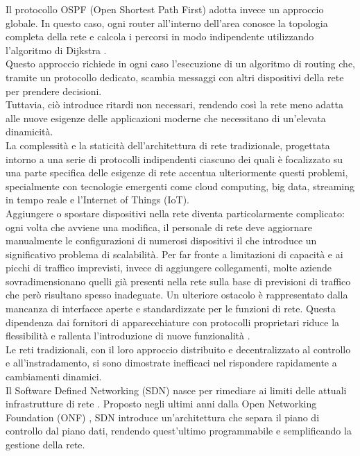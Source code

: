 Il protocollo OSPF (Open Shortest Path First) adotta invece un approccio globale.
In questo caso, ogni router all'interno dell'area conosce la topologia completa della rete e calcola i percorsi in modo indipendente utilizzando l'algoritmo di Dijkstra \cite{ospf}. 
\\Questo approccio richiede in ogni caso l'esecuzione di un algoritmo di routing che, tramite un protocollo dedicato, 
scambia messaggi con altri dispositivi della rete per prendere decisioni.
\\Tuttavia, ciò introduce ritardi non necessari, rendendo così la rete meno adatta alle nuove esigenze delle applicazioni moderne che necessitano di un'elevata dinamicità.
\\La complessità e la staticità dell'architettura di rete tradizionale, progettata intorno a una serie di protocolli indipendenti ciascuno dei quali è focalizzato su una parte specifica delle esigenze di rete accentua ulteriormente questi problemi, specialmente con tecnologie emergenti come cloud computing, big data, streaming in tempo reale e l'Internet of Things (IoT).
\\Aggiungere o spostare dispositivi nella rete diventa particolarmente complicato: ogni volta che avviene una modifica, il personale di rete deve aggiornare manualmente le configurazioni di numerosi dispositivi il che introduce un significativo problema di scalabilità.
Per far fronte a limitazioni di capacità e ai picchi di traffico imprevisti, invece di aggiungere collegamenti, molte aziende sovradimensionano quelli già presenti nella rete sulla base di previsioni di traffico che però risultano spesso inadeguate.
Un ulteriore ostacolo è rappresentato dalla mancanza di interfacce aperte e standardizzate per le funzioni di rete. %
Questa dipendenza dai fornitori di apparecchiature con protocolli proprietari riduce la flessibilità e rallenta l'introduzione di nuove funzionalità \cite{probtrad}.
\\Le reti tradizionali, con il loro approccio distribuito e decentralizzato al controllo e all'instradamento, si sono dimostrate inefficaci nel rispondere rapidamente a cambiamenti dinamici.
\\Il Software Defined Networking (SDN) nasce per rimediare ai limiti delle attuali infrastrutture di rete \cite{sdnsurvey}.
Proposto negli ultimi anni dalla Open Networking Foundation (ONF) \cite{ONF}, SDN introduce un'architettura che separa il piano di controllo dal piano dati, rendendo quest'ultimo programmabile e semplificando la gestione della rete. 
